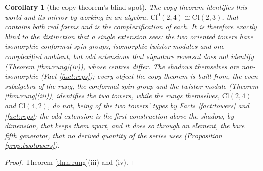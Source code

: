 \documentclass[11pt]{article}
\newtheorem{corollary}[theorem]{Corollary}
\theoremstyle{definition}
\newcommand{\Cl}{\mathrm{Cl}}
\begin{document}
\begin{corollary}[the copy theorem's blind spot]\label{cor:blind}
The copy theorem identifies this world and its mirror by working in an algebra, $\Cl^{0}(2,4) \cong \Cl(2,3)$, that contains both real forms and is the complexification of each. It is therefore exactly blind to the distinction that a single extension sees: the two oriented towers have isomorphic conformal spin groups, isomorphic twistor modules and one complexified ambient, but odd extensions that signature reversal does not identify (Theorem \ref{thm:rung}(iv)), whose centres differ. The shadows themselves are non-isomorphic (Fact \ref{fact:reps}); every object the copy theorem is built from, the even subalgebra of the rung, the conformal spin group and the twistor module (Theorem \ref{thm:rung}(iii)), identifies the two towers, while the rungs themselves, $\Cl(2,4)$ and $\Cl(4,2)$, do not, being of the two towers' types by Facts \ref{fact:towers} and \ref{fact:reps}; the odd extension is the first construction above the shadow, by dimension, that keeps them apart, and it does so through an element, the bare fifth generator, that no derived quantity of the series uses (Proposition \ref{prop:twotowers}).
\end{corollary}

\begin{proof}
Theorem \ref{thm:rung}(iii) and (iv).
\end{proof}
\end{document}
